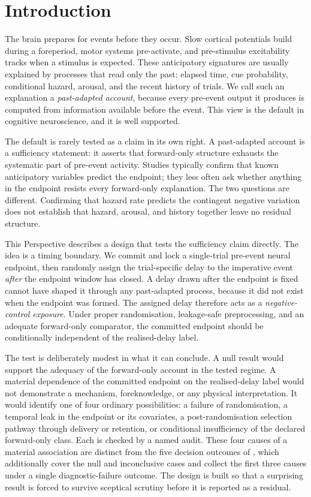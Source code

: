 \documentclass[11pt,a4paper]{article}
\theoremstyle{definition}
\begin{document}
\section{Introduction}
\label{sec:introduction}

The brain prepares for events before they occur. Slow cortical potentials build
during a foreperiod, motor systems pre-activate, and pre-stimulus excitability
tracks when a stimulus is expected. These anticipatory signatures are usually
explained by processes that read only the past: elapsed time, cue probability,
conditional hazard, arousal, and the recent history of trials. We call such an
explanation a \textit{past-adapted account}, because every pre-event output it
produces is computed from information available before the event. This view is
the default in cognitive neuroscience, and it is well supported.

The default is rarely tested as a claim in its own right. A past-adapted account
is a sufficiency statement: it asserts that forward-only structure exhausts the
systematic part of pre-event activity. Studies typically confirm that known
anticipatory variables predict the endpoint; they less often ask whether
anything in the endpoint resists every forward-only explanation. The two
questions are different. Confirming that hazard rate predicts the contingent
negative variation does not establish that hazard, arousal, and history together
leave no residual structure.

This Perspective describes a design that tests the sufficiency claim directly. The
idea is a timing boundary. We commit and lock a single-trial pre-event neural
endpoint, then randomly assign the trial-specific delay to the imperative event
\textit{after} the endpoint window has closed. A delay drawn after the endpoint is
fixed cannot have shaped it through any past-adapted process, because it did not
exist when the endpoint was formed. The assigned delay therefore acts as a
\textit{negative-control exposure}. Under proper randomisation, leakage-safe
preprocessing, and an adequate forward-only comparator, the committed endpoint
should be conditionally independent of the realised-delay label.

The test is deliberately modest in what it can conclude. A null result would
support the adequacy of the forward-only account in the tested regime. A material
dependence of the committed endpoint on the realised-delay label would not
demonstrate a mechanism, foreknowledge, or any physical interpretation. It would
identify one of four ordinary possibilities: a failure of randomisation, a
temporal leak in the endpoint or its covariates, a post-randomisation selection
pathway through delivery or retention, or conditional insufficiency of the
declared forward-only class. Each is checked by a named audit. These four causes
of a material association are distinct from the five decision outcomes of
, which additionally cover the null and inconclusive cases and
collect the first three causes under a single diagnostic-failure outcome. The design is
built so that a surprising result is forced to survive sceptical scrutiny before
it is reported as a residual.
\end{document}
